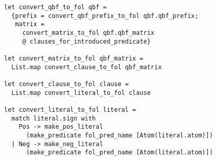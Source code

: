 \begin{lstlisting}[language=caml, label=raisingtofol]
let convert_qbf_to_fol qbf =
  {prefix = convert_qbf_prefix_to_fol qbf.qbf_prefix;
   matrix = 
     convert_matrix_to_fol qbf.qbf_matrix 
     @ clauses_for_introduced_predicate}

let convert_matrix_to_fol qbf_matrix =
  List.map convert_clause_to_fol qbf_matrix

let convert_clause_to_fol clause =
  List.map convert_literal_to_fol clause

let convert_literal_to_fol literal =
  match literal.sign with
    Pos -> make_pos_literal 
      (make_predicate fol_pred_name [Atom(literal.atom)])
  | Neg -> make_neg_literal 
      (make_predicate fol_pred_name [Atom(literal.atom)])
\end{lstlisting}
